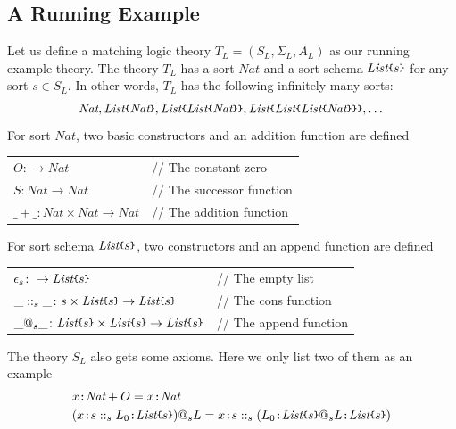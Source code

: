 \documentclass[UTF8,11pt]{article}
\theoremstyle{plain}
\theoremstyle{definition}
\theoremstyle{remark}
\newcommand{\cln}{\texttt{:}}
\newcommand{\Nat}{\textit{Nat}}
\newcommand{\List}{\textit{List}}
\newcommand{\parametric}[2]{{#1}\raisebox{.2ex}{\texttt{\footnotesize{\{}}}#2\raisebox{.2ex}{\texttt{\footnotesize{\}}}}}
\newcommand{\doubleslash}{/\!/{ }}
\begin{document}
\subsection{A Running Example}
Let us define a matching logic theory $T_L = (S_L, \Sigma_L, A_L)$ as our 
running example theory.
The theory $T_L$ has a sort $\Nat$ and a sort schema $\parametric{\List}{s}$ 
for any sort $s \in S_L$.
In other words, $T_L$ has the following infinitely many sorts:
$$\Nat, \parametric{\List}{\Nat},  
\parametric{\List}{\parametric{\List}{\Nat}}, 
\parametric{\List}{\parametric{\List}{\parametric{\List}{\Nat}}} ,\dots $$
For sort $\Nat$, two basic constructors and an addition function are defined
\begin{center}
\begin{tabular}{ll}
  $O \colon \to \Nat$       & \doubleslash The constant zero \\
  $S \colon \Nat \to \Nat$  & \doubleslash The successor function \\
  $\_+\_ \colon \Nat \times \Nat \to \Nat$ & \doubleslash The addition function
\end{tabular}
\end{center}

For sort schema $\parametric{\List}{s}$, two constructors and an append
function are defined 
\begin{center}
	\begin{tabular}{ll}
		$\epsilon_s \colon \to \parametric{\List}{s}$       & 
		\doubleslash The empty list \\
		$\_::_s\_ \colon s \times \parametric{\List}{s} \to 
		\parametric{\List}{s}$  & 
		\doubleslash The cons function \\
		$\_@_s\_ \colon \parametric{\List}{s} \times \parametric{\List}{s} \to 
		\parametric{\List}{s}$ & \doubleslash The append function
	\end{tabular}
\end{center}
The theory $S_L$ also gets some axioms.
Here we only list two of them as an example
\begin{align*}
& x \cln \Nat + O = x \cln \Nat \\
& (x \cln s ::_s L_0 \cln \parametric{\List}{s}) @_s L = x \cln s::_s (L_0 \cln 
\parametric{\List}{s}@_s L\cln \parametric{\List}{s})
\end{align*}
\end{document}
